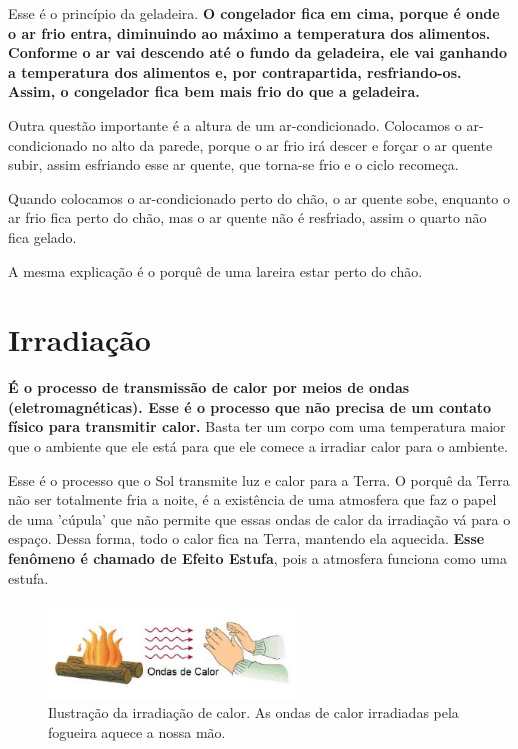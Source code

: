 \documentclass[12pt]{extarticle}
\newcommand{\<}{\langle}
\renewcommand{\>}{\rangle}
\theoremstyle{definition}
\begin{document}
Esse é o princípio da geladeira. \textbf{O congelador fica em cima, porque é onde o ar frio entra, diminuindo ao máximo a temperatura dos alimentos. Conforme o ar vai descendo até o fundo da geladeira, ele vai ganhando a temperatura dos alimentos e, por contrapartida, resfriando-os. Assim, o congelador fica bem mais frio do que a geladeira.}
    
    Outra questão importante é a altura de um ar-condicionado. Colocamos o ar-condicionado no alto da parede, porque o ar frio irá descer e forçar o ar quente subir, assim esfriando esse ar quente, que torna-se frio e o ciclo recomeça.
    
    Quando colocamos o ar-condicionado perto do chão, o ar quente sobe, enquanto o ar frio fica perto do chão, mas o ar quente não é resfriado, assim o quarto não fica gelado.
    
    A mesma explicação é o porquê de uma lareira estar perto do chão.

\section{Irradiação}

\textbf{É o processo de transmissão de calor por meios de ondas (eletromagnéticas). Esse é o processo que não precisa de um contato físico para transmitir calor.} Basta ter um corpo com uma temperatura maior que o ambiente que ele está para que ele comece a irradiar calor para o ambiente.

Esse é o processo que o Sol transmite luz e calor para a Terra. O porquê da Terra não ser totalmente fria a noite, é a existência de uma atmosfera que faz o papel de uma 'cúpula' que não permite que essas ondas de calor da irradiação vá para o espaço. Dessa forma, todo o calor fica na Terra, mantendo ela aquecida. \textbf{Esse fenômeno é chamado de Efeito Estufa}, pois a atmosfera funciona como uma estufa.
\begin{figure}[h]
    \centering
    \includegraphics[width=0.6\textwidth]{ir_1.jpg}
    \caption{Ilustração da irradiação de calor. As ondas de calor irradiadas pela fogueira aquece a nossa mão.}
    \label{fig:irradiacao}
\end{figure}
\end{document}
